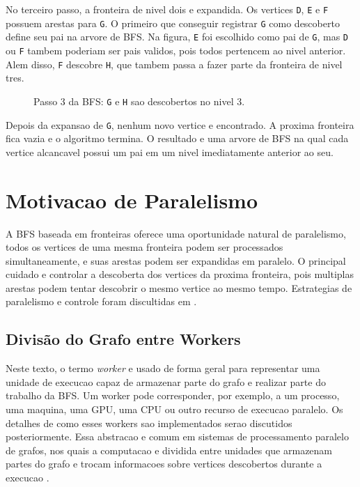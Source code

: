 \documentclass{article}
\begin{document}
No terceiro passo, a fronteira de nivel dois e expandida. Os vertices
\texttt{D}, \texttt{E} e \texttt{F} possuem arestas para \texttt{G}. O primeiro
que conseguir registrar \texttt{G} como descoberto define seu pai na arvore de
BFS. Na figura, \texttt{E} foi escolhido como pai de \texttt{G}, mas
\texttt{D} ou \texttt{F} tambem poderiam ser pais validos, pois todos pertencem
ao nivel anterior. Alem disso, \texttt{F} descobre \texttt{H}, que tambem passa
a fazer parte da fronteira de nivel tres.

\begin{figure}[H]
\centering
{}
\caption{Passo 3 da BFS: \texttt{G} e \texttt{H} sao descobertos no nivel 3.}
\label{fig:bfs-step3}
\end{figure}

Depois da expansao de \texttt{G}, nenhum novo vertice e encontrado. A proxima
fronteira fica vazia e o algoritmo termina. O resultado e uma arvore de BFS na
qual cada vertice alcancavel possui um pai em um nivel imediatamente anterior ao
seu.

\section{Motivacao de Paralelismo}
A BFS baseada em fronteiras oferece uma oportunidade natural de paralelismo, todos
os vertices de uma mesma fronteira podem ser processados simultaneamente, e suas
arestas podem ser expandidas em paralelo. O principal cuidado e controlar a
descoberta dos vertices da proxima fronteira, pois multiplas arestas podem tentar
descobrir o mesmo vertice ao mesmo tempo. Estrategias de paralelismo e controle foram
discultidas em \cite{merrillgpu}. 

\subsection{Divisão do Grafo entre Workers}
Neste texto, o termo \textit{worker} e usado de forma geral para representar uma
unidade de execucao capaz de armazenar parte do grafo e realizar parte do trabalho
da BFS. Um worker pode corresponder, por exemplo, a um processo, uma maquina, uma
GPU, uma CPU ou outro recurso de execucao paralelo. Os detalhes de como esses
workers sao implementados serao discutidos posteriormente. Essa abstracao e
comum em sistemas de processamento paralelo de grafos, nos quais a computacao e
dividida entre unidades que armazenam partes do grafo e trocam informacoes sobre
vertices descobertos durante a execucao \cite{merrillgpu}.
\end{document}
